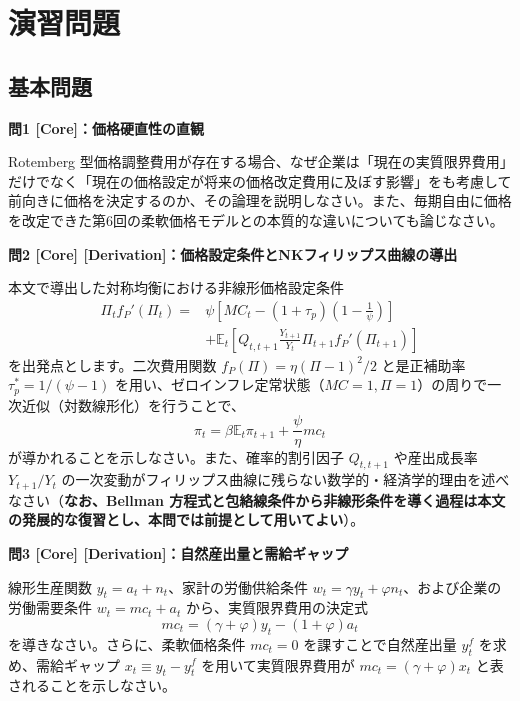 \documentclass[
  japanese,
  lualatex,
  ja=standard,
  12pt,
  a4paper]{ltjsarticle}
\begin{document}
\Needspace{0.24\textheight}

\section{演習問題}\label{ux6f14ux7fd2ux554fux984c}

\subsection{基本問題}\label{ux57faux672cux554fux984c}

\textbf{問1 {[}Core{]}：価格硬直性の直観}

Rotemberg
型価格調整費用が存在する場合、なぜ企業は「現在の実質限界費用」だけでなく「現在の価格設定が将来の価格改定費用に及ぼす影響」をも考慮して前向きに価格を決定するのか、その論理を説明しなさい。また、毎期自由に価格を改定できた第6回の柔軟価格モデルとの本質的な違いについても論じなさい。

\Needspace{0.18\textheight}

\textbf{問2 {[}Core{]}
{[}Derivation{]}：価格設定条件とNKフィリップス曲線の導出}

本文で導出した対称均衡における非線形価格設定条件 \[
\begin{aligned}
\Pi_tf_P'(\Pi_t)={}&
\psi\left[
MC_t-(1+\tau_p)\left(1-\frac{1}{\psi}\right)
\right]\\
&+\mathbb{E}_t\left[
Q_{t,t+1}\frac{Y_{t+1}}{Y_t}
\Pi_{t+1}f_P'(\Pi_{t+1})
\right]
\end{aligned}
\] を出発点とします。二次費用関数 \(f_P(\Pi)=\eta(\Pi-1)^2/2\)
と是正補助率 \(\tau_p^*=1/(\psi-1)\)
を用い、ゼロインフレ定常状態（\(MC=1, \Pi=1\)）の周りで一次近似（対数線形化）を行うことで、
\[
\pi_t
=\beta\mathbb{E}_t\pi_{t+1}
+\frac{\psi}{\eta}mc_t
\] が導かれることを示しなさい。また、確率的割引因子 \(Q_{t,t+1}\)
や産出成長率 \(Y_{t+1}/Y_t\)
の一次変動がフィリップス曲線に残らない数学的・経済学的理由を述べなさい（\textbf{なお、Bellman
方程式と包絡線条件から非線形条件を導く過程は本文の発展的な復習とし、本問では前提として用いてよい}）。

\Needspace{0.18\textheight}

\textbf{問3 {[}Core{]} {[}Derivation{]}：自然産出量と需給ギャップ}

線形生産関数 \(y_t=a_t+n_t\)、家計の労働供給条件
\(w_t=\gamma y_t+\varphi n_t\)、および企業の労働需要条件
\(w_t=mc_t+a_t\) から、実質限界費用の決定式 \[
mc_t=(\gamma+\varphi)y_t-(1+\varphi)a_t
\] を導きなさい。さらに、柔軟価格条件 \(mc_t=0\) を課すことで自然産出量
\(y_t^f\) を求め、需給ギャップ \(x_t \equiv y_t - y_t^f\)
を用いて実質限界費用が \(mc_t=(\gamma+\varphi)x_t\)
と表されることを示しなさい。
\end{document}
